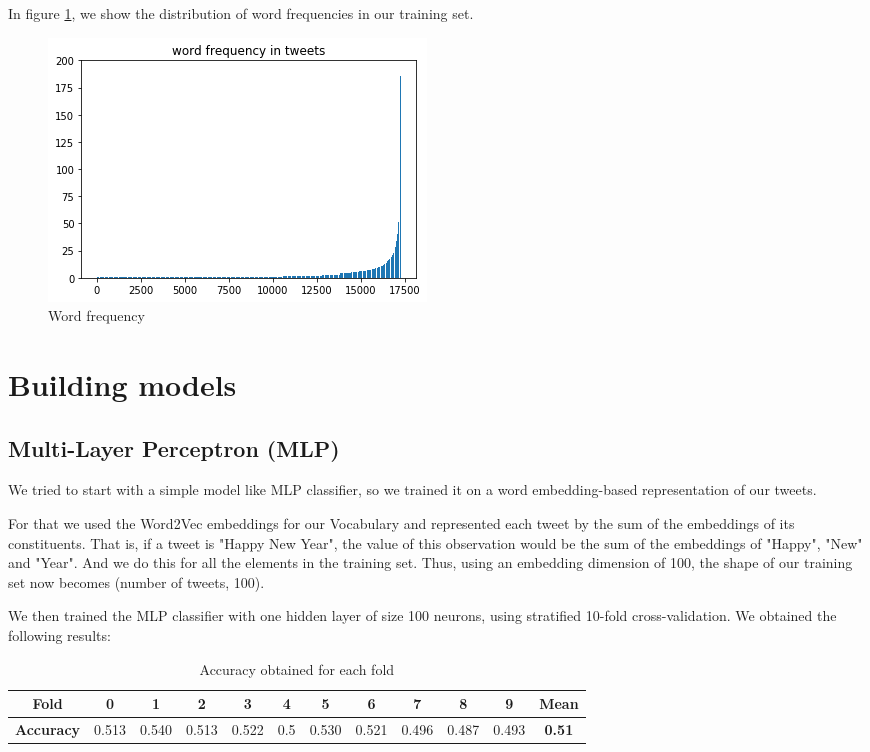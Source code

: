 \documentclass[a4paper,english,12pt]{article}
\begin{document}
In figure \ref{freq}, we show the distribution of word frequencies in our training set. 

\begin{figure}[h!]
\centering
\includegraphics[scale=1]{freq}
\caption{Word frequency}
\label{freq}
\end{figure}

\section{Building models}
\subsection{Multi-Layer Perceptron (MLP)}
We tried to start with a simple model like MLP classifier, so we trained it on a word embedding-based representation of our tweets. 

For that we used the Word2Vec embeddings for our Vocabulary and represented each tweet by the sum of the embeddings of its constituents. That is, if a tweet is "Happy New Year", the value of this observation would be the sum of the embeddings of "Happy", "New" and "Year". And we do this for all the elements in the training set. Thus, using an embedding dimension of 100, the shape of our training set now becomes (number of tweets, 100).

We then trained the MLP classifier with one hidden layer of size 100 neurons, using stratified 10-fold cross-validation. We obtained the following results: 


\begin{table}[H]\centering
	\begin{tabular}{cccccccccccc}
		\toprule
		\textbf{Fold} & 0 & 1 & 2 & 3 & 4 & 5 & 6 & 7 & 8 & 9 & \textbf{Mean} \\    \midrule
		\textbf{Accuracy} & 0.513 & 0.540 & 0.513 & 0.522 & 0.5 & 0.530 & 0.521 & 0.496 & 0.487 & 0.493& \textbf{0.51}  \\   
		\bottomrule	
	\end{tabular}
	\caption{Accuracy obtained for each fold}
\end{table}
\end{document}
